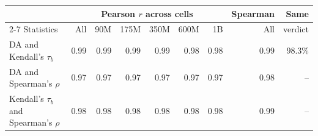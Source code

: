 \begin{tabular}{lrrrrrrrr}
\toprule
 & \multicolumn{6}{c}{Pearson $r$ across cells} & Spearman & Same \\
\cmidrule(lr){2-7}
Statistics & All & 90M & 175M & 350M & 600M & 1B & All & verdict \\
\midrule
DA and Kendall's $\tau_b$ & 0.99 & 0.99 & 0.99 & 0.99 & 0.98 & 0.98 & 0.99 & 98.3\% \\
DA and Spearman's $\rho$ & 0.97 & 0.97 & 0.97 & 0.97 & 0.97 & 0.97 & 0.98 & -- \\
Kendall's $\tau_b$ and Spearman's $\rho$ & 0.98 & 0.98 & 0.98 & 0.98 & 0.98 & 0.98 & 0.99 & -- \\
\bottomrule
\end{tabular}
